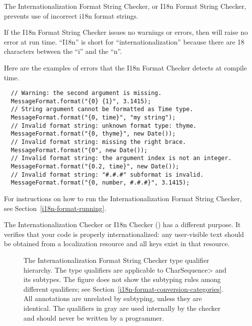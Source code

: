 \htmlhr
{}

The Internationalization Format String Checker, or I18n Format String Checker,
prevents use of incorrect i18n format strings.

If the I18n Format String Checker issues no warnings or errors, then
will raise no error at run time.
``I18n'' is short for
``internationalization'' because there are 18 characters between the ``i'' and
the ``n''.

Here are the examples of errors that the
I18n Format Checker
detects at compile time.

\begin{Verbatim}
  // Warning: the second argument is missing.
  MessageFormat.format("{0} {1}", 3.1415);
  // String argument cannot be formatted as Time type.
  MessageFormat.format("{0, time}", "my string");
  // Invalid format string: unknown format type: thyme.
  MessageFormat.format("{0, thyme}", new Date());
  // Invalid format string: missing the right brace.
  MessageFormat.format("{0", new Date());
  // Invalid format string: the argument index is not an integer.
  MessageFormat.format("{0.2, time}", new Date());
  // Invalid format string: "#.#.#" subformat is invalid.
  MessageFormat.format("{0, number, #.#.#}", 3.1415);
\end{Verbatim}

For instructions on how to run the Internationalization Format String
Checker, see Section~\ref{i18n-format-running}.

The Internationalization Checker or I18n Checker ()
has a different purpose.  It verifies that your code is properly
internationalized: any user-visible text should be obtained from a
localization resource and all keys exist in that resource.




\begin{figure}
\caption{The
  Internationalization
  Format String Checker type qualifier hierarchy.
  The type qualifiers are applicable to \<CharSequence> and its subtypes.
  The figure does not show the subtyping rules among different
  qualifiers; see
  Section~\ref{i18n-format-conversion-categories}.
  All  annotations
  are unrelated by subtyping, unless they are identical.
  The qualifiers in gray are used internally by
  the checker and should never be written by a programmer.
}
\label{i18n-format-type-hierarchy}
\end{figure}

